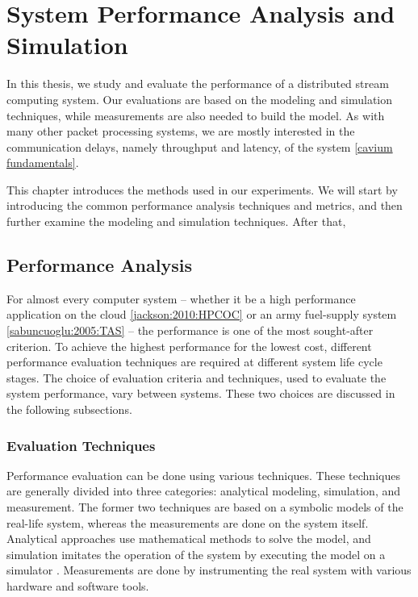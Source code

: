 \chapter{System Performance Analysis and Simulation}
\label{chapter:system-performance-analysis-and-simulation}
In this thesis, we study and evaluate the performance of a distributed stream computing system. Our evaluations are based on the modeling and simulation techniques, while measurements are also needed to build the model. As with many other packet processing systems, we are mostly interested in the communication delays, namely throughput and latency, of the system \ref{cavium fundamentals}.

This chapter introduces the methods used in our experiments. We will start by introducing the common performance analysis techniques and metrics, and then further examine the modeling and simulation techniques. After that, 

\section{Performance Analysis}
For almost every computer system -- whether it be a high performance application on the cloud \ref{jackson:2010:HPCOC} or an army fuel-supply system \ref{sabuncuoglu:2005:TAS} -- the performance is one of the most sought-after criterion. To achieve the highest performance for the lowest cost, different performance evaluation techniques are required at different system life cycle stages. The choice of evaluation criteria and techniques, used to evaluate the system performance, vary between systems. These two choices are discussed in the following subsections. \cite{jain:1991:AOCSPA}

\subsection{Evaluation Techniques}
Performance evaluation can be done using various techniques. These techniques are generally divided into three categories: analytical modeling, simulation, and measurement. The former two techniques are based on a symbolic models of the real-life system, whereas the measurements are done on the system itself. Analytical approaches use mathematical methods to solve the model, and simulation imitates the operation of the system by executing the model on a simulator \cite{Banks:2010:DES}. Measurements are done by instrumenting the real system with various hardware and software tools. \cite{jain:1991:AOCSPA}

